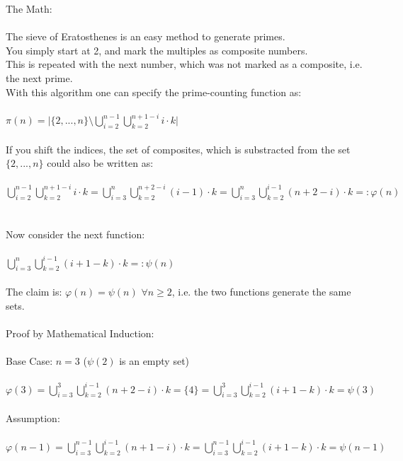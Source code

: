 \documentclass[12pt,ngerman]{article}
\theoremstyle{definition}
\begin{document}
The Math:\\\\
The sieve of Eratosthenes is an easy method to generate primes.\\
You simply start at 2, and mark the multiples as composite numbers.\\
This is repeated with the next number, which was not marked as a composite, i.e. the next prime.\\
With this algorithm one can specify the prime-counting function as:\\\\
$\pi(n) = \vert \{2,...,n\} \setminus \bigcup\limits_{i = 2}^{n-1} \bigcup\limits_{k = 2}^{n+1-i} i \cdot k \vert$\\\\
If you shift the indices, the set of composites, which is substracted from the set $\{2,...,n\}$ could also be written as:\\\\
$\bigcup\limits_{i = 2}^{n-1} \bigcup\limits_{k = 2}^{n+1-i} i \cdot k = \bigcup\limits_{i = 3}^{n} \bigcup\limits_{k = 2}^{n+2-i} (i-1) \cdot k = \bigcup\limits_{i = 3}^{n} \bigcup\limits_{k = 2}^{i-1} (n+2-i) \cdot k =: \varphi(n)$\\\\\\
Now consider the next function:\\\\
$\bigcup\limits_{i = 3}^{n} \bigcup\limits_{k = 2}^{i-1} (i+1-k) \cdot k =: \psi(n)$\\\\
The claim is: $\varphi(n) = \psi(n)$ $\forall n \geq 2$, i.e. the two functions generate the same sets.\\\\
Proof by Mathematical Induction:\\\\
Base Case: $n=3$ ($\psi(2)$ is an empty set)\\\\
$\varphi(3) = \bigcup\limits_{i = 3}^{3} \bigcup\limits_{k = 2}^{i-1} (n+2-i) \cdot k = \{4\} = \bigcup\limits_{i = 3}^{3} \bigcup\limits_{k = 2}^{i-1} (i+1-k) \cdot k = \psi(3)$\\\\
Assumption:\\\\
$\varphi(n-1) = \bigcup\limits_{i = 3}^{n-1} \bigcup\limits_{k = 2}^{i-1} (n+1-i) \cdot k = \bigcup\limits_{i = 3}^{n-1} \bigcup\limits_{k = 2}^{i-1} (i+1-k) \cdot k = \psi(n-1)$\\\\
\end{document}
